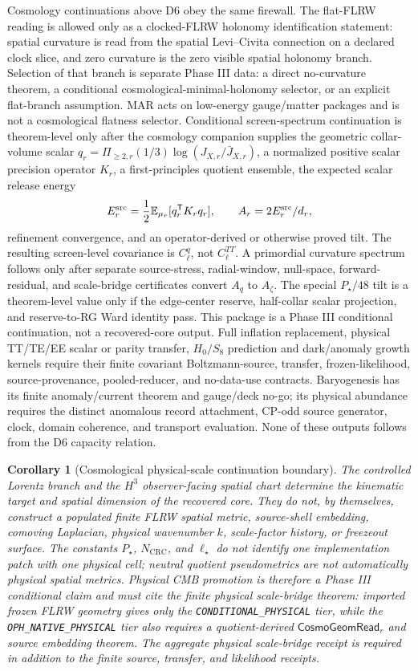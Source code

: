 \documentclass[11pt]{article}
\newtheorem{corollary}[theorem]{Corollary}
\begin{document}
Cosmology continuations above D6 obey the same firewall. The flat-FLRW reading is allowed only as a
clocked-FLRW holonomy identification statement: spatial curvature is read from the spatial
Levi--Civita connection on a declared clock slice, and zero curvature is the zero visible spatial
holonomy branch. Selection of that branch is separate Phase III data: a direct no-curvature theorem,
a conditional cosmological-minimal-holonomy selector, or an explicit flat-branch assumption. MAR
acts on low-energy gauge/matter packages and is not a cosmological flatness selector. Conditional
screen-spectrum continuation is
theorem-level only after the cosmology companion supplies the geometric collar-volume scalar
\(q_r=\Pi_{\ge2,r}(1/3)\log(J_{X,r}/\bar J_{X,r})\), a normalized positive scalar precision
operator \(K_r\), a first-principles quotient ensemble, the expected scalar release energy
\[
E_r^{\rm src}=\frac12\mathbb E_{\mu_r}[q_r^{\mathsf T}K_rq_r],\qquad
A_r=2E_r^{\rm src}/d_r,
\]
refinement convergence, and an operator-derived or otherwise proved tilt.  The resulting
screen-level covariance is \(C_\ell^q\), not \(C_\ell^{TT}\).  A primordial curvature
spectrum follows only after separate source-stress, radial-window, null-space, forward-residual,
and scale-bridge certificates convert \(A_q\) to \(A_\zeta\).  The special \(P_\star/48\) tilt is
a theorem-level value only if the edge-center reserve, half-collar scalar projection, and
reserve-to-RG Ward identity pass. This package is a Phase III conditional continuation, not a
recovered-core output. Full inflation replacement, physical TT/TE/EE scalar or parity transfer,
\(H_0/S_8\) prediction and dark/anomaly growth kernels require their finite
covariant Boltzmann-source, transfer, frozen-likelihood, source-provenance, pooled-reducer, and
no-data-use contracts. Baryogenesis has its finite anomaly/current theorem and gauge/deck no-go;
its physical abundance requires the distinct anomalous record attachment, CP-odd source generator,
clock, domain coherence, and transport evaluation. None of these outputs follows from the D6 capacity relation.

\begin{corollary}[Cosmological physical-scale continuation boundary]
The controlled Lorentz branch and the \(H^3\) observer-facing spatial chart determine the
kinematic target and spatial dimension of the recovered core.  They do not, by themselves, construct
a populated finite FLRW spatial metric, source-shell embedding, comoving Laplacian, physical
wavenumber \(k\), scale-factor history, or freezeout surface.  The constants \(P_\star\),
\(N_{\mathrm{CRC}}\), and \(\ell_\star\) do not identify one implementation patch with one physical
cell; neutral quotient pseudometrics are not automatically physical spatial metrics.  Physical CMB
promotion is therefore a Phase III conditional claim and must cite the finite physical
scale-bridge theorem: imported frozen FLRW geometry gives only the
\texttt{CONDITIONAL\_PHYSICAL} tier, while the \texttt{OPH\_NATIVE\_PHYSICAL} tier also requires a
quotient-derived \(\mathsf{CosmoGeomRead}_r\) and source embedding theorem.  The aggregate physical
scale-bridge receipt is required in addition to the finite source, transfer, and likelihood
receipts.
\end{corollary}
\end{document}
